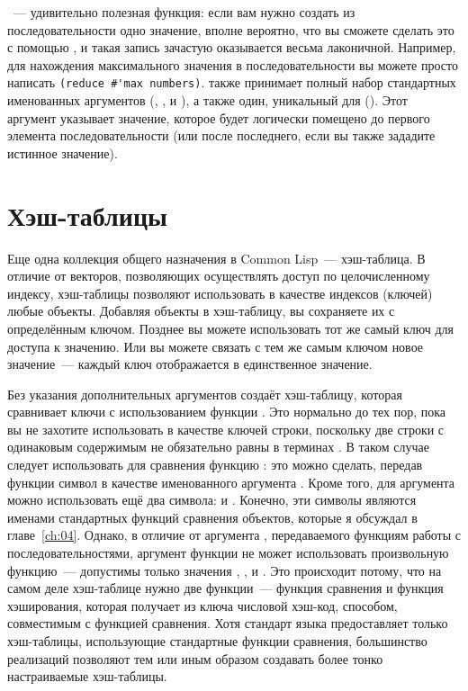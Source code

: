 ~--- удивительно полезная функция: если вам нужно создать из
последовательности одно значение, вполне вероятно, что вы сможете сделать это с помощью
, и такая запись зачастую оказывается весьма лаконичной.
Например, для нахождения максимального значения в последовательности вы можете просто
написать \lstinline!(reduce #'max numbers)!.  также принимает полный набор
стандартных именованных аргументов (, ,  и
), а также один, уникальный для  ().  Этот
аргумент указывает значение, которое будет логически помещено до первого элемента
последовательности (или после последнего, если вы также зададите  истинное
значение).

\section{Хэш-таблицы}

Еще одна коллекция общего назначения в Common Lisp~--- хэш-таблица.  В отличие от векторов,
позволяющих осуществлять доступ по целочисленному индексу,
хэш-таблицы позволяют использовать в качестве индексов (ключей) любые объекты.
Добавляя объекты в хэш-таблицу, вы сохраняете их с определённым ключом.  Позднее вы
можете использовать тот же самый ключ для доступа к значению.  Или вы можете связать
с тем же самым ключом новое значение~--- каждый ключ отображается в единственное значение.

Без указания дополнительных аргументов  создаёт хэш-таблицу, которая
сравнивает ключи с использованием функции .  Это нормально до тех пор, пока вы
не захотите использовать в качестве ключей строки, поскольку две строки с одинаковым
содержимым не обязательно равны в терминах .  В таком случае следует
использовать для сравнения функцию : это можно сделать, передав функции
 символ  в качестве именованного аргумента .
Кроме того, для аргумента  можно использовать ещё два символа:  и
.  Конечно, эти символы являются именами стандартных функций сравнения
объектов, которые я обсуждал в главе~\ref{ch:04}.  Однако, в отличие от аргумента ,
передаваемого функциям работы с последовательностями, аргумент  функции
 не может использовать произвольную функцию~--- допустимы только
значения , ,  и .  Это происходит потому, что
на самом деле хэш-таблице нужно две функции~--- функция сравнения и функция
хэширования, которая получает из ключа числовой хэш-код, способом, совместимым с
функцией сравнения.  Хотя стандарт языка предоставляет
только хэш-таблицы, использующие стандартные функции сравнения, большинство
реализаций позволяют тем или иным образом создавать более тонко настраиваемые
хэш-таблицы.

